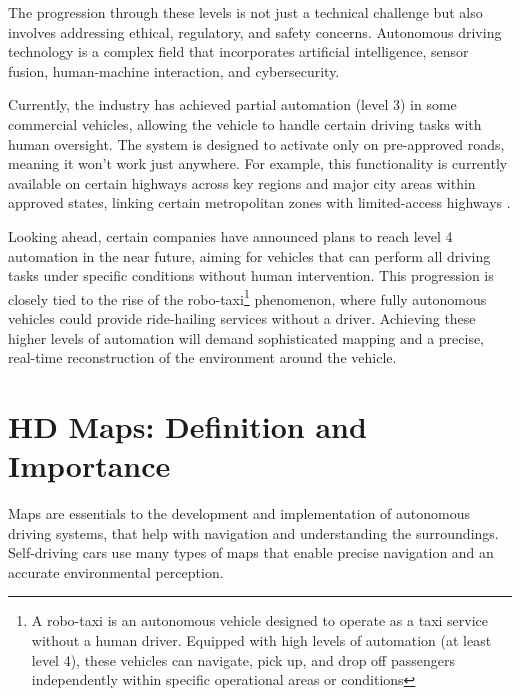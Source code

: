 The progression through these levels is not just a technical challenge but also involves addressing ethical, regulatory, and safety concerns. Autonomous driving technology is a complex field that incorporates artificial intelligence, sensor fusion, human-machine interaction, and cybersecurity. 

Currently, the industry has achieved partial automation (level 3) in some commercial vehicles, allowing the vehicle to handle certain driving tasks with human oversight. The system is designed to activate only on pre-approved roads, meaning it won’t work just anywhere. For example, this functionality is currently available on certain highways across key regions and major city areas within approved states, linking certain metropolitan zones with limited-access highways \cite{bmw2024}.

Looking ahead, certain companies have announced plans to reach level 4 automation in the near future, aiming for vehicles that can perform all driving tasks under specific conditions without human intervention. This progression is closely tied to the rise of the robo-taxi\footnote{A robo-taxi is an autonomous vehicle designed to operate as a taxi service without a human driver. Equipped with high levels of automation (at least level 4), these vehicles can navigate, pick up, and drop off passengers independently within specific operational areas or conditions} phenomenon, where fully autonomous vehicles could provide ride-hailing services without a driver. Achieving these higher levels of automation will demand sophisticated mapping and a precise, real-time reconstruction of the environment around the vehicle.

\section{HD Maps: Definition and Importance}

Maps are essentials to the development and implementation of autonomous driving systems, that help with navigation and understanding the surroundings. Self-driving cars use many types of maps that enable precise navigation and an accurate environmental perception. 

